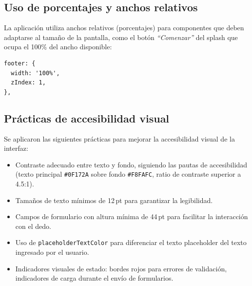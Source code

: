 \subsection{Uso de porcentajes y anchos relativos}

La aplicaci\'on utiliza anchos relativos (porcentajes) para componentes que
deben adaptarse al tama\~no de la pantalla, como el bot\'on \textit{``Comenzar''}
del splash que ocupa el 100\% del ancho disponible:

\begin{lstlisting}
footer: {
  width: '100%',
  zIndex: 1,
},
\end{lstlisting}

\subsection{Pr\'acticas de accesibilidad visual}

Se aplicaron las siguientes pr\'acticas para mejorar la accesibilidad visual de
la interfaz:

\begin{itemize}
  \item Contraste adecuado entre texto y fondo, siguiendo las pautas de
    accesibilidad (texto principal \texttt{\#0F172A} sobre fondo
    \texttt{\#F8FAFC}, ratio de contraste superior a 4.5:1).
  \item Tama\~nos de texto m\'inimos de 12\,pt para garantizar la legibilidad.
  \item Campos de formulario con altura m\'inima de 44\,pt para facilitar la
    interacci\'on con el dedo.
  \item Uso de \texttt{placeholderTextColor} para diferenciar el texto
    placeholder del texto ingresado por el usuario.
  \item Indicadores visuales de estado: bordes rojos para errores de
    validaci\'on, indicadores de carga durante el env\'io de formularios.
\end{itemize}
